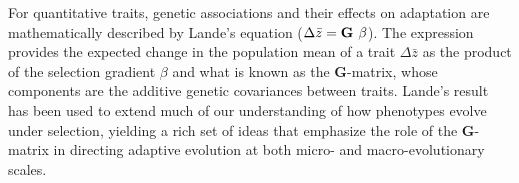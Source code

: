 \documentclass[11pt,twocolumn]{article}
\newcommand{\G}{\textbf{G}}
\begin{document}
% 
% 
% 
% 

For quantitative traits, genetic associations and their effects on adaptation are mathematically described by Lande's equation ($\Delta \bar{z} = \G \hspace{.05in}\beta$). The expression provides the expected change in the population mean of a trait $\Delta \bar{z}$ as the product of the selection gradient $\beta$ and what is known as the \G-matrix, whose components are the additive genetic covariances between traits. Lande’s result has been used to extend much of our understanding of how phenotypes evolve under selection, yielding a rich set of ideas that emphasize the role of the \G-matrix in directing adaptive evolution at both micro- and macro-evolutionary scales.\par
% 
% 
\end{document}
